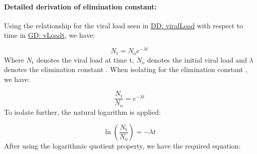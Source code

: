 \documentclass[12pt]{article}
\begin{document}
\paragraph{Detailed derivation of elimination constant:}
\label{IM:calofElimConstDeriv}
Using the relationship for the viral load seen in \hyperref[DD:viralLoad]{DD: viralLoad} with respect to time in \hyperref[GD:vLoadt]{GD: vLoadt}, we have:

\begin{displaymath}
{N_{\text{t}}}={N_{\text{o}}} e^{-λ t}
\end{displaymath}
Where ${N_{\text{t}}}$ denotes the viral load at time t, ${N_{\text{o}}}$ denotes the initial viral load and $λ$ denotes the elimination constant . When isolating for the elimination constant ,  we have:

\begin{displaymath}
\frac{{N_{\text{t}}}}{{N_{\text{o}}}}=e^{-λ t}
\end{displaymath}
To isolate further, the natural logarithm is applied:

\begin{displaymath}
\ln\left(\frac{{N_{\text{t}}}}{{N_{\text{o}}}}\right)=-λ t
\end{displaymath}
After using the logarithmic quotient property, we have the required equation:
\end{document}
